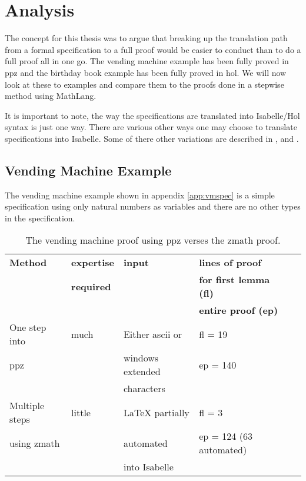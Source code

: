 \chapter{Analysis}
\label{ch:analysis}

The concept for this thesis was to argue that breaking up the translation path from a formal specification to a full proof would be easier to conduct than to do a full proof all in one go. The vending machine example has been fully proved in \gls{ppz} and the birthday book example has been fully proved in \gls{hol}. We will now look at these to examples and compare them to the proofs done in a stepwise method using MathLang.

It is important to note, the way the specifications are translated into Isabelle/Hol syntax is just one way. There are various other ways one may choose to translate specifications into Isabelle. Some of there other variations are described in \cite{Kolyang1996}, \cite{Kolyang86towardsa} and \cite{hol-z}.

\section{Vending Machine Example}

The vending machine example shown in appendix \ref{app:vmspec} is a simple specification using only natural numbers as variables and there are no other types in the specification. 

\begin{table}[H]
\begin{center}
\begin{tabular}{| l || l | l | l | l |}
\hline
\textbf{Method} & \textbf{expertise} &  \textbf{input} & \textbf{lines of proof}  \\
& \textbf{required} & & \textbf{for first lemma (fl)}  \\
& & & \textbf{entire proof (ep)} \\
\hline
One step into & much & Either ascii or & fl = 19  \\
\gls{ppz} & & windows extended & ep = 140 \\
& & characters & \\
\hline
Multiple steps & little & \LaTeX{} partially & fl = 3  \\
using \gls{zmath} & & automated & ep = 124 (63 automated) \\
& & into Isabelle & \\
\hline
\end{tabular}
\end{center}
\caption{The vending machine proof using \gls{ppz} verses the \gls{zmath} proof.}
\label{tab:comparevm}
\end{table}

